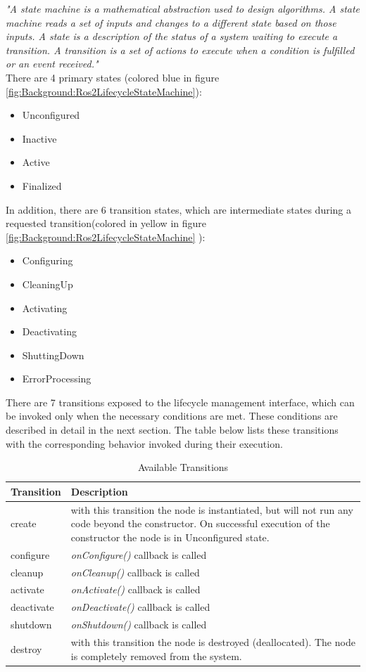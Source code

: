 	\textit{"A state machine is a mathematical abstraction used to design algorithms. A state machine reads a set of inputs and changes to a different state based on those inputs. A state is a description of the status of a system waiting to execute a transition. A transition is a set of actions to execute when a condition is fulfilled or an event received."} \cite*{statemachineDef}\\

	\vspace{1cm}
	There are 4 primary states (colored blue in figure \ref{fig:Background:Ros2LifecycleStateMachine}):
	\begin{itemize}
		\item Unconfigured
		\item Inactive
		\item Active
		\item Finalized
	\end{itemize}
	\vspace{1cm}

	In addition, there are 6 transition states, which are intermediate states during a requested transition(colored in yellow in figure \ref{fig:Background:Ros2LifecycleStateMachine} ):
	\begin{itemize}
		\item Configuring
		\item CleaningUp
		\item Activating
		\item Deactivating
		\item ShuttingDown
		\item ErrorProcessing
	\end{itemize}
	There are 7 transitions exposed to the lifecycle management interface, which can be invoked only when the necessary conditions are met. These conditions are described in detail in the next section. The table below lists these transitions with the corresponding behavior invoked during their execution.
	\begin{table}[H]
		\centering
		\caption{Available Transitions}
		\label{tab:Valid transitions}
		\begin{tabular}{|p{2cm}|p{9cm}|}
			\toprule
			Transition & Description\\
			\midrule
			create & with this transition the node is instantiated, but will not run any code beyond the constructor. On successful execution of the constructor the node is in Unconfigured state. \\
			configure & \textit{onConfigure()} callback is called\\
			cleanup & \textit{onCleanup()} callback is called\\
			activate & \textit{onActivate()} callback is called\\
			deactivate & \textit{onDeactivate()} callback is called\\
			shutdown & \textit{onShutdown()} callback is called\\
			destroy & with this transition the node is destroyed (deallocated). The node is completely removed from the system. \\
			\bottomrule
		\end{tabular}
	\end{table}

